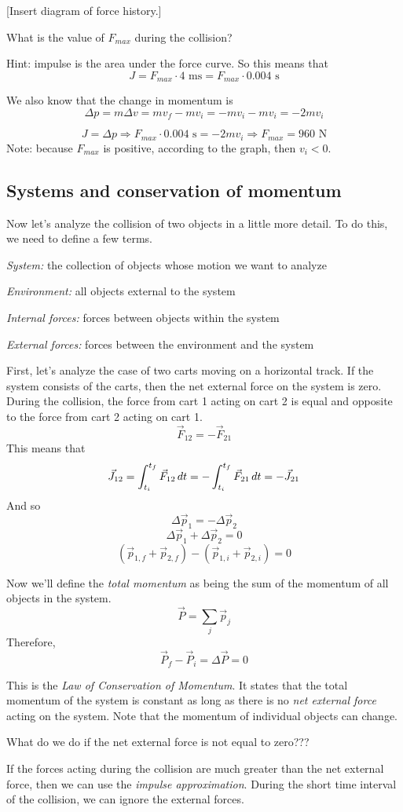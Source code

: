 [Insert diagram of force history.]
\vspace{5cm}

What is the value of $F_{max}$ during the collision?

Hint: impulse is the area under the force curve. So this means that 
$$J=F_{max}\cdot 4\mbox{ ms}=F_{max}\cdot 0.004\mbox{ s}$$

We also know that the change in momentum is 
$$\Delta{p}=m\Delta{v}=mv_f-mv_i=-mv_i-mv_i=-2mv_i$$

$$J=\Delta{p}\Rightarrow F_{max}\cdot 0.004\mbox{ s}=-2mv_i\Rightarrow F_{max}=960\mbox{ N}$$
Note: because $F_{max}$ is positive, according to the graph, then $v_i<0$.

\subsection{Systems and conservation of momentum}
Now let's analyze the collision of two objects in a little more detail. To do this, we need to define a few terms.

\textit{System:} the collection of objects whose motion we want to analyze

\textit{Environment:} all objects external to the system

\textit{Internal forces:} forces between objects within the system

\textit{External forces:} forces between the environment and the system

First, let's analyze the case of two carts moving on a horizontal track. If the system consists of the carts, then the net external force on the system is zero. During the collision, the force from cart 1 acting on cart 2 is equal and opposite to the force from cart 2 acting on cart 1.
$$\vec{F}_{12}=-\vec{F}_{21}$$
This means that
$$\vec{J}_{12}=\displaystyle\int_{t_i}^{t_f}\vec{F}_{12}\,dt=-\displaystyle\int_{t_i}^{t_f}\vec{F}_{21}\,dt=-\vec{J}_{21}$$
And so
$$\Delta \vec{p}_1 = -\Delta \vec{p}_2$$
$$\Delta \vec{p}_1 + \Delta \vec{p}_2 = 0$$
$$(\vec{p}_{1,f}+\vec{p}_{2,f})-(\vec{p}_{1,i}+\vec{p}_{2,i})=0$$

Now we'll define the \textit{total momentum} as being the sum of the momentum of all objects in the system.
$$\vec{P}=\sum_j \vec{p}_j$$
Therefore,
$$\vec{P}_f-\vec{P}_i=\Delta \vec{P} = 0$$

This is the \textit{Law of Conservation of Momentum}. It states that the total momentum of the system is constant as long as there is no \textit{net external force} acting on the system. Note that the momentum of individual objects can change.

What do we do if the net external force is not equal to zero???

If the forces acting during the collision are much greater than the net external force, then we can use the \textit{impulse approximation}. During the short time interval of the collision, we can ignore the external forces.


\clearpage
